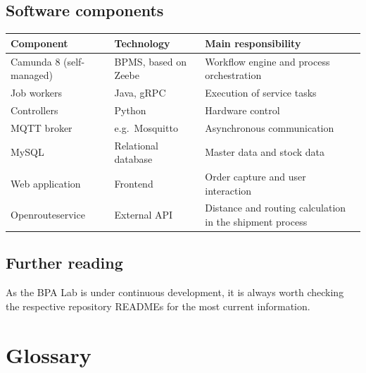 \documentclass[
  english,
  11pt,
  a4paper,
]{scrbook}
\newcounter{none} %
\begin{document}
\section{Software components}\label{software-components}

{\def\LTcaptype{none} %
\begin{longtable}[]{@{}
  >{\raggedright\arraybackslash}p{}
  >{\raggedright\arraybackslash}p{}
  >{\raggedright\arraybackslash}p{}@{}}
\toprule\noalign{}
\begin{minipage}[b]{\linewidth}\raggedright
Component
\end{minipage} & \begin{minipage}[b]{\linewidth}\raggedright
Technology
\end{minipage} & \begin{minipage}[b]{\linewidth}\raggedright
Main responsibility
\end{minipage} \\
\midrule\noalign{}
\endhead
\bottomrule\noalign{}
\endlastfoot
Camunda 8 (self-managed) & BPMS, based on Zeebe & Workflow engine and
process orchestration \\
Job workers & Java, gRPC & Execution of service tasks \\
Controllers & Python & Hardware control \\
MQTT broker & e.g.~Mosquitto & Asynchronous communication \\
MySQL & Relational database & Master data and stock data \\
Web application & Frontend & Order capture and user interaction \\
Openrouteservice & External API & Distance and routing calculation in
the shipment process \\
\end{longtable}
}

\section{Further reading}\label{further-reading-1}

As the BPA Lab is under continuous development, it is always worth
checking the respective repository READMEs for the most current
information.

\chapter{Glossary}\label{glossary}
\end{document}
